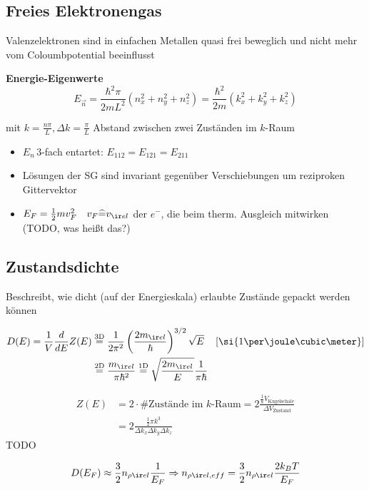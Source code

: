 \subsection{Freies Elektronengas}
Valenzelektronen sind in einfachen Metallen quasi frei beweglich und nicht mehr vom Coloumbpotential beeinflusst
\begin{sectionbox}
    \begin{emphbox}
        \textbf{Energie-Eigenwerte}
        \begin{equation*}
            E_{\vec n} = \frac{\hbar^2\pi}{2mL^2}(n_x^2+n_y^2+n_z^2) = \frac{\hbar^2}{2m}(k_x^2+k_y^2+k_z^2)
        \end{equation*}
    \end{emphbox}
    mit $k=\frac{n\pi}{L}, \Delta k = \frac{\pi}{L}$ Abstand zwischen zwei Zuständen im $k$-Raum \\

    \begin{itemize}
        \item $E_n \, 3$-fach entartet: $E_{112} = E_{121} = E_{211}$
        \item Lösungen der SG sind invariant gegenüber Verschiebungen um reziproken Gittervektor
        \item $E_F=\frac{1}{2}mv_F^2 \quad v_F \widehat{=} v_{\ir el}$ der $e^-$, die beim therm. Ausgleich mitwirken (TODO, was heißt das?)
    \end{itemize}
\end{sectionbox}

\subsection{Zustandsdichte}
Beschreibt, wie dicht (auf der Energieskala) erlaubte Zustände gepackt werden können
\begin{sectionbox}
    \begin{emphbox}
        \begin{align*}
            D(E) = \frac{1}{V}\frac{d}{dE}Z(E) & \overset{3\text{D}}{=} \frac{1}{2\pi^2}\left(\frac{2m_{\ir el}}{\hbar}\right)^{3/2}\sqrt{E} \quad \left[\si{1 \per \joule \cubic\meter}\right] \\
                                               & \overset{2\text{D}}{=}\frac{m_{\ir el}}{\pi\hbar^2} \overset{1\text{D}}{=} \sqrt{\frac{2m_{\ir el}}{E}}\frac{1}{\pi\hbar}
        \end{align*}
    \end{emphbox}

    \begin{align*}
        Z(E) & = 2\cdot \text{\#Zustände im }k\text{-Raum} = 2\frac{\frac{1}{8}V_{\text{Kugelschale}}}{\Delta V_{\text{Zustand}}} \\
             & = 2\frac{\frac{1}{2}\pi k^3}{\Delta k_x\Delta k_y\Delta k_z}
    \end{align*} TODO

    \begin{equation*}
        D(E_F) \approx \frac32 n_{\rho\ir el} \frac{1}{E_F} \Rightarrow n_{\rho\ir el,eff} = \frac32 n_{\rho\ir el} \frac{2k_BT}{E_F}
    \end{equation*}
\end{sectionbox}

